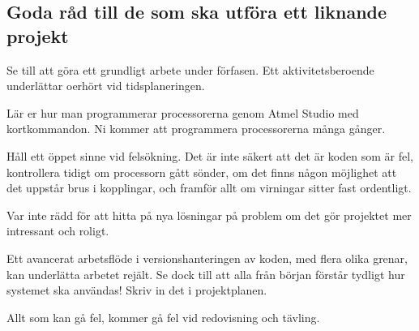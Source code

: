 \documentclass[a4paper,12pt]{article}
\begin{document}
\subsection{Goda råd till de som ska utföra ett liknande projekt}
Se till att göra ett grundligt arbete under förfasen. Ett aktivitetsberoende underlättar oerhört vid tidsplaneringen. 

Lär er hur man programmerar processorerna genom Atmel Studio med kortkommandon. Ni kommer att programmera processorerna många gånger.

Håll ett öppet sinne vid felsökning. Det är inte säkert att det är koden som är fel, kontrollera tidigt om processorn gått sönder, om det finns någon möjlighet att det uppstår brus i kopplingar, och framför allt om virningar sitter fast ordentligt. 

Var inte rädd för att hitta på nya lösningar på problem om det gör projektet mer intressant och roligt.

Ett avancerat arbetsflöde i versionshanteringen av koden, med flera olika grenar, kan underlätta arbetet rejält. Se dock till att alla från början förstår tydligt hur systemet ska användas! Skriv in det i projektplanen.

Allt som kan gå fel, kommer gå fel vid redovisning och tävling.
\end{document}
